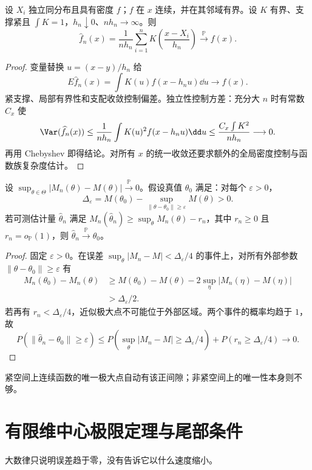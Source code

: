 \begin{proposition}[核密度估计的逐点一致性]
设 $X_i$ 独立同分布且具有密度 $f$；$f$ 在 $x$ 连续，并在其邻域有界。设 $K$ 有界、支撑紧且 $\int K=1$，$h_n\downarrow0$、$nh_n\to\infty$。则
\[
 \widehat f_n(x)=\frac1{nh_n}\sum_{i=1}^nK\!\left(\frac{x-X_i}{h_n}\right)
 \xrightarrow{\mathbb P}f(x).
\]
\end{proposition}
\begin{proof}
变量替换 $u=(x-y)/h_n$ 给
\[
 E\widehat f_n(x)=\int K(u)f(x-h_nu)\dd u\longrightarrow f(x).
\]
紧支撑、局部有界性和支配收敛控制偏差。独立性控制方差：充分大 $n$ 时有常数 $C_x$ 使
\[
 \Var(\widehat f_n(x))\le\frac1{nh_n}\int K(u)^2f(x-h_nu)\dd u
 \le\frac{C_x\int K^2}{nh_n}\longrightarrow0.
\]
再用 Chebyshev 即得结论。对所有 $x$ 的统一收敛还要求额外的全局密度控制与函数族复杂度估计。
\end{proof}

\begin{theorem}[经验准则的近似极大点一致性]
设 $\sup_{\theta\in\Theta}|M_n(\theta)-M(\theta)|\xrightarrow{\mathbb P}0$。假设真值 $\theta_0$ 满足：对每个 $\varepsilon>0$，
\[
 \Delta_\varepsilon=M(\theta_0)
 -\sup_{\|\theta-\theta_0\|\ge\varepsilon}M(\theta)>0.
\]
若可测估计量 $\widehat\theta_n$ 满足 $M_n(\widehat\theta_n)\ge\sup_\theta M_n(\theta)-r_n$，其中 $r_n\ge0$ 且 $r_n=o_{\mathbb P}(1)$，则 $\widehat\theta_n\xrightarrow{\mathbb P}\theta_0$。
\end{theorem}
\begin{proof}
固定 $\varepsilon>0$。在误差 $\sup_\theta|M_n-M|<\Delta_\varepsilon/4$ 的事件上，对所有外部参数 $\|\theta-\theta_0\|\ge\varepsilon$ 有
\begin{align*}
 M_n(\theta_0)-M_n(\theta)
 &\ge M(\theta_0)-M(\theta)-2\sup_\eta|M_n(\eta)-M(\eta)|\\
 &>\Delta_\varepsilon/2.
\end{align*}
若再有 $r_n<\Delta_\varepsilon/4$，近似极大点不可能位于外部区域。两个事件的概率均趋于 $1$，故
\[
 P(\|\widehat\theta_n-\theta_0\|\ge\varepsilon)
 \le P\!\left(\sup_\theta|M_n-M|\ge\Delta_\varepsilon/4\right)
 +P(r_n\ge\Delta_\varepsilon/4)\longrightarrow0.
\]
\end{proof}
紧空间上连续函数的唯一极大点自动有该正间隙；非紧空间上的唯一性本身则不够。

\section{有限维中心极限定理与尾部条件}

大数律只说明误差趋于零，没有告诉它以什么速度缩小。

